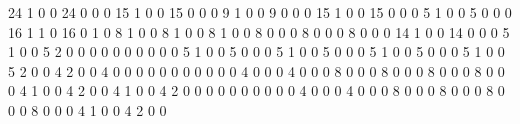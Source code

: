 24
1
0
0
24
0
0
0
15
1
0
0
15
0
0
0
9
1
0
0
9
0
0
0
15
1
0
0
15
0
0
0
5
1
0
0
5
0
0
0
16
1
1
0
16
0
1
0
8
1
0
0
8
1
0
0
8
1
0
0
8
0
0
0
8
0
0
0
8
0
0
0
14
1
0
0
14
0
0
0
5
1
0
0
5
2
0
0
0
0
0
0
0
0
0
0
5
1
0
0
5
0
0
0
5
1
0
0
5
0
0
0
5
1
0
0
5
0
0
0
5
1
0
0
5
2
0
0
4
2
0
0
4
0
0
0
0
0
0
0
0
0
0
0
4
0
0
0
4
0
0
0
8
0
0
0
8
0
0
0
8
0
0
0
8
0
0
0
4
1
0
0
4
2
0
0
4
1
0
0
4
2
0
0
0
0
0
0
0
0
0
0
4
0
0
0
4
0
0
0
8
0
0
0
8
0
0
0
8
0
0
0
8
0
0
0
4
1
0
0
4
2
0
0
